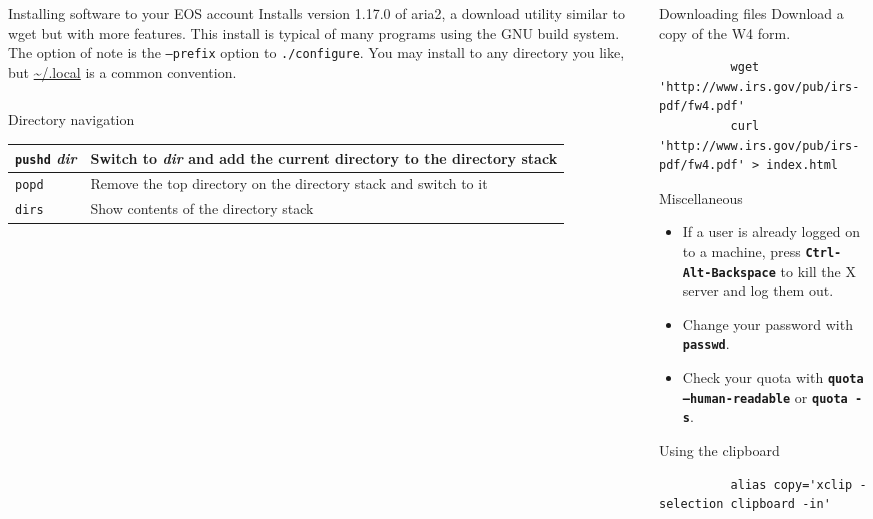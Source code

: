 \documentclass[8pt]{beamer}
\newcommand{\command}[1]{\textbf{\texttt{#1}}}
\begin{document}
\begin{frame}[fragile]{}
\begin{columns}
\begin{column}{0.33\textwidth}
\begin{block}{Installing software to your EOS account}
        Installs version 1.17.0 of aria2, a download utility similar to wget but with more features. This install is typical of many programs using the GNU build system. The option of note is the \texttt{--prefix} option to \texttt{./configure}. You may install to any directory you like, but \url{\~/.local} is a common convention. \\
        {\scriptsize \inputminted[tabsize=2]{bash}{scripts/install-aria2.bash}}
      \end{block}
      \begin{block}{Directory navigation}
        \begin{tabu} to 0.9\linewidth { X X }
          \texttt{pushd} \textit{dir} & Switch to \textit{dir} and add the current directory to the directory stack \\ \hline
          \texttt{popd} & Remove the top directory on the directory stack and switch to it \\ \hline
          \texttt{dirs} & Show contents of the directory stack
        \end{tabu}
      \end{block}
    \end{column}
    \begin{column}{0.33\textwidth}
      \begin{block}{Downloading files}
        Download a copy of the W4 form.
        \begin{verbatim}
          wget 'http://www.irs.gov/pub/irs-pdf/fw4.pdf'
          curl 'http://www.irs.gov/pub/irs-pdf/fw4.pdf' > index.html
        \end{verbatim}
      \end{block}
      \begin{block}{Miscellaneous}
        \begin{itemize}
        \item If a user is already logged on to a machine, press \command{Ctrl-Alt-Backspace} to kill the X server and log them out.
        \item Change your password with \command{passwd}.
        \item Check your quota with \command{quota --human-readable} or \command{quota -s}.
        \end{itemize}
      \end{block}
      \begin{block}{Using the clipboard}
        \begin{verbatim}
          alias copy='xclip -selection clipboard -in'

\end{verbatim}
\end{block}
\end{column}
\end{columns}
\end{frame}
\end{document}
